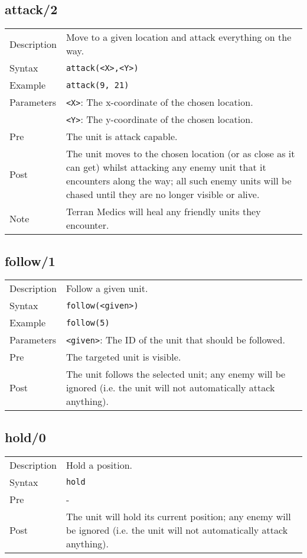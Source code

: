 \subsection{attack/2}
\begin{tabularx}{\textwidth}{lX}
 Description & Move to a given location and attack everything on the way. \\
 Syntax & \verb|attack(<X>,<Y>)| \\
 Example & \verb|attack(9, 21)| \\
 Parameters & \verb|<X>|: The x-coordinate of the chosen location. \\
            & \verb|<Y>|: The y-coordinate of the chosen location. \\
 Pre & The unit is attack capable. \\
 Post & The unit moves to the chosen location (or as close as it can get) whilst attacking any enemy unit that it encounters along the way; all such enemy units will be chased until they are no longer visible or alive. \\
 Note & Terran Medics will heal any friendly units they encounter.
\end{tabularx}

\subsection{follow/1}
\begin{tabularx}{\textwidth}{lX}
 Description & Follow a given unit. \\
 Syntax & \verb|follow(<given>)| \\
 Example & \verb|follow(5)| \\
 Parameters & \verb|<given>|: The ID of the unit that should be followed. \\
 Pre & The targeted unit is visible. \\
 Post & The unit follows the selected unit; any enemy will be ignored (i.e. the unit will not automatically attack anything).
\end{tabularx}

\subsection{hold/0}
\begin{tabularx}{\textwidth}{lX}
 Description & Hold a position. \\
 Syntax & \verb|hold| \\
 Pre & - \\
 Post & The unit will hold its current position; any enemy will be ignored (i.e. the unit will not automatically attack anything). 
\end{tabularx}

